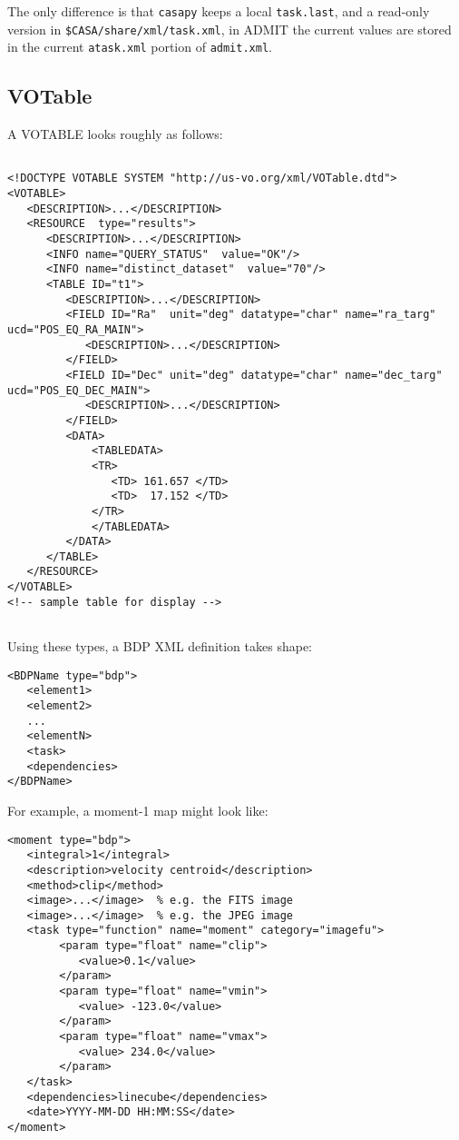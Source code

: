 \documentclass{article}
\begin{document}
\noindent
The only difference is that {\tt casapy} keeps a local {\tt task.last}, and a 
read-only version in {\tt \$CASA/share/xml/task.xml}, in ADMIT the current values
are stored in the current {\tt atask.xml} portion of {\tt admit.xml}.

\subsection{VOTable}

A VOTABLE looks roughly as follows:

\begin{verbatim}

<!DOCTYPE VOTABLE SYSTEM "http://us-vo.org/xml/VOTable.dtd">
<VOTABLE>
   <DESCRIPTION>...</DESCRIPTION>
   <RESOURCE  type="results">
      <DESCRIPTION>...</DESCRIPTION>
      <INFO name="QUERY_STATUS"  value="OK"/>
      <INFO name="distinct_dataset"  value="70"/>
      <TABLE ID="t1">
         <DESCRIPTION>...</DESCRIPTION>
         <FIELD ID="Ra"  unit="deg" datatype="char" name="ra_targ"  ucd="POS_EQ_RA_MAIN"> 
            <DESCRIPTION>...</DESCRIPTION>
         </FIELD>
         <FIELD ID="Dec" unit="deg" datatype="char" name="dec_targ" ucd="POS_EQ_DEC_MAIN">
            <DESCRIPTION>...</DESCRIPTION>
         </FIELD>
         <DATA>
             <TABLEDATA>
             <TR>
                <TD> 161.657 </TD>
                <TD>  17.152 </TD>
             </TR>
             </TABLEDATA>
         </DATA>
      </TABLE>
   </RESOURCE>
</VOTABLE>
<!-- sample table for display -->
         

\end{verbatim}

Using these types, a BDP XML definition takes shape:

\begin{verbatim}
<BDPName type="bdp">
   <element1>
   <element2>
   ...
   <elementN>
   <task>
   <dependencies>
</BDPName>

\end{verbatim}

\noindent For example, a moment-1 map might look like:

\begin{verbatim}
<moment type="bdp">
   <integral>1</integral>
   <description>velocity centroid</description>
   <method>clip</method>
   <image>...</image>  % e.g. the FITS image
   <image>...</image>  % e.g. the JPEG image
   <task type="function" name="moment" category="imagefu">
        <param type="float" name="clip">
           <value>0.1</value>
        </param>
        <param type="float" name="vmin">
           <value> -123.0</value>
        </param>
        <param type="float" name="vmax">
           <value> 234.0</value>
        </param>
   </task>
   <dependencies>linecube</dependencies>
   <date>YYYY-MM-DD HH:MM:SS</date>
</moment>

\end{verbatim}
\end{document}
